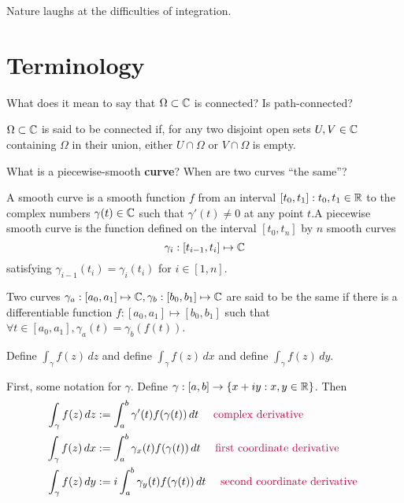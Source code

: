 \documentclass{homework}
\author{Jim Fowler}
\begin{document}
\maketitle

\begin{inspiration}
Nature laughs at the difficulties of integration.
\end{inspiration}

\section{Terminology}

\begin{problem}
  What does it mean to say that $\Omega \subset \mathbb{C}$ is connected?  Is path-connected?  
  \end{problem}
  \begin{solution}
  $\Omega\subset \mathbb{C}$ is said to be connected if, for any two disjoint open sets $U,V\in \mathbb{C}$ containing $\Omega$ in their union, either $U\cap \Omega$ or $V\cap \Omega$ is empty.
  \end{solution}
  \begin{problem}
    What is a piecewise-smooth \textbf{curve}?  When are two curves ``the same''?  
    \end{problem}
    \begin{solution}
    A smooth curve is a smooth function $f$ from an interval $[t_0, t_1]: t_0, t_1\in\mathbb{R}$ to the complex numbers $\gamma(t)\in \mathbb{C}$ such that $\gamma'(t)\neq 0$ at any point $t$.A piecewise smooth curve is the function defined on the interval $[t_0, t_n]$ by $n$ smooth curves $$\gamma_i:[t_{i-1}, t_i]\mapsto \mathbb{C}$$ satisfying $\gamma_{i-1}(t_{i}) = \gamma_{i}(t_{i})$ for $i\in [1, n]$.

    Two curves $\gamma_a:[a_0, a_1] \mapsto \mathbb{C}, \gamma_b:[b_0, b_1]\mapsto \mathbb{C}$ are said to be the same if there is a differentiable function $f: [a_0, a_1] \mapsto [b_0, b_1]$ such that $\forall t\in [a_0, a_1], \gamma_a(t) = \gamma_b(f(t))$.
    \end{solution}
    \begin{problem}
        Define $\int_\gamma f(z) \, dz$ and define $\int_\gamma f(z) \, dx$ and define $\int_\gamma f(z) \, dy$.
        \end{problem}
        \begin{solution}
        First, some notation for $\gamma$. Define $\gamma:[a,b]\to \{x + iy:x, y \in \mathbb{R}\}$. Then
        \begin{align*}
        \int_\gamma f(z) \, dz &:= \int_{a}^b \gamma'(t)f(\gamma(t)) \, dt\quad \color{purple}\text{ complex derivative }\\
        \int_\gamma f(z) \, dx &:= \int_{a}^b \gamma_x(t)f(\gamma(t)) \, dt\quad\color{purple}\text{ first coordinate derivative }\\
        \int_\gamma f(z) \, dy &:= i\int_{a}^b \gamma_y(t)f(\gamma(t)) \,dt\quad \color{purple}\text{ second coordinate derivative }
        \end{align*}
        \end{solution}
\end{document}
